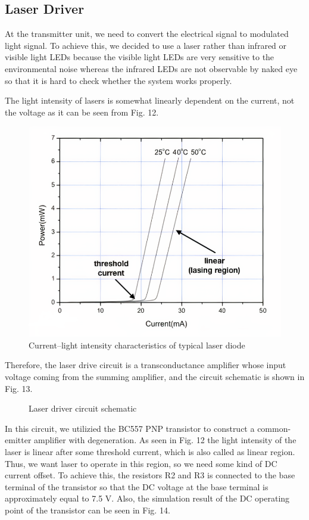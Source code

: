 \documentclass[conference]{IEEEtran}
\begin{document}
\subsection{Laser Driver}
At the transmitter unit, we need to convert the electrical signal to modulated light signal. To achieve this, we decided to use a laser rather than infrared or visible light LEDs because the visible light LEDs are very sensitive to the environmental noise whereas the infrared LEDs are not observable by naked eye so that it is hard to check whether the system works properly. \\ 
\par The light intensity of lasers is somewhat linearly dependent on the current, not the voltage as it can be seen from Fig. 12.
 \begin{figure}[H]
   \centerline{\includegraphics[scale=0.5]{laser.png}}
    \caption{Current–light intensity characteristics of typical laser diode}
\end{figure} 
\par Therefore, the laser drive circuit is a transconductance amplifier whose input voltage coming from the summing amplifier, and the circuit schematic is shown in Fig. 13.
 \begin{figure}[H]
   \centerline{}
    \caption{Laser driver circuit schematic}
\end{figure} 
\par In this circuit, we utilizied the BC557 PNP transistor to construct a common-emitter amplifier with degeneration. As seen in Fig. 12 the light intensity of the laser is linear after some threshold current, which is also called as linear region. Thus, we want laser to operate in this region, so we need some kind of DC current offset. To achieve this, the resistors R2 and R3 is connected to the base terminal of the transistor so that the DC voltage at the base terminal is approximately equal to 7.5 V. Also, the simulation result of the DC operating point of the transistor can be seen in Fig. 14. 
\end{document}
